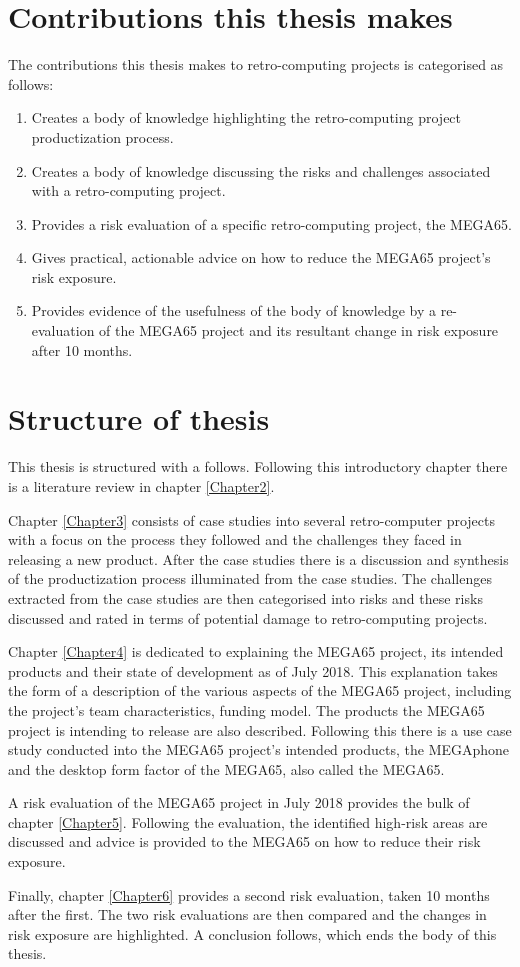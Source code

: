 \section{Contributions this thesis makes}
The contributions this thesis makes to retro-computing projects is categorised as follows:
\begin{enumerate}
\item Creates a body of knowledge highlighting the retro-computing project productization process.
\item Creates a body of knowledge discussing the risks and challenges associated with a retro-computing project.
\item Provides a risk evaluation of a specific retro-computing project, the MEGA65.
\item Gives practical, actionable advice on how to reduce the MEGA65 project's risk exposure.
\item Provides evidence of the usefulness of the body of knowledge by a re-evaluation of the MEGA65 project and its resultant change in risk exposure after 10 months.
\end{enumerate}

\section{Structure of thesis}
This thesis is structured with a follows. Following this introductory chapter there is a literature review in chapter \ref{Chapter2}. 

Chapter \ref{Chapter3} consists of case studies into several retro-computer projects with a focus on the process they followed and the challenges they faced in releasing a new product. After the case studies there is a discussion and synthesis of the productization process illuminated from the case studies. The challenges extracted from the case studies are then categorised into risks and these risks discussed and rated in terms of potential damage to retro-computing projects. 

Chapter \ref{Chapter4} is dedicated to explaining the MEGA65 project, its intended products and their state of development as of July 2018. This explanation takes the form of a description of the various aspects of the MEGA65 project, including the project's team characteristics, funding model. The products the MEGA65 project is intending to release are also described. Following this there is a use case study conducted into the MEGA65 project's intended products, the MEGAphone and the desktop form factor of the MEGA65, also called the MEGA65. 

A risk evaluation of the MEGA65 project in July 2018 provides the bulk of chapter \ref{Chapter5}. Following the evaluation, the identified high-risk areas are discussed and advice is provided to the MEGA65 on how to reduce their risk exposure. 

Finally, chapter \ref{Chapter6} provides a second risk evaluation, taken 10 months after the first. The two risk evaluations are then compared and the changes in risk exposure are highlighted. A conclusion follows, which ends the body of this thesis.